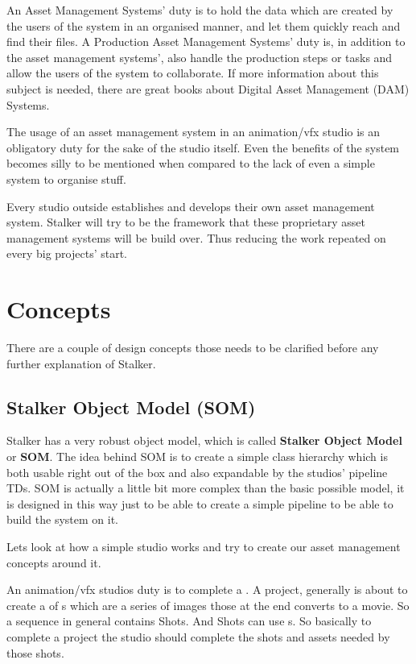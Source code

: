 \documentclass[a4paper,10pt,english]{sphinxmanual}
\begin{document}
An Asset Management Systems' duty is to hold the data which are created by the
users of the system in an organised manner, and let them quickly reach and find
their files. A Production Asset Management Systems' duty is, in addition to the
asset management systems', also handle the production steps or tasks and
allow the users of the system to collaborate. If more information about this
subject is needed, there are great books about Digital Asset Management (DAM)
Systems.

The usage of an asset management system in an animation/vfx studio is an
obligatory duty for the sake of the studio itself. Even the benefits of the
system becomes silly to be mentioned when compared to the lack of even a simple
system to organise stuff.

Every studio outside establishes and develops their own asset management
system. Stalker will try to be the framework that these proprietary asset
management systems will be build over. Thus reducing the work repeated on every
big projects' start.


\section{Concepts}
\label{design:concepts}
There are a couple of design concepts those needs to be clarified before any
further explanation of Stalker.


\subsection{Stalker Object Model (SOM)}
\label{design:stalker-object-model-som}
Stalker has a very robust object model, which is called
\textbf{Stalker Object Model} or \textbf{SOM}. The idea behind SOM is to create a simple
class hierarchy which is both usable right out of the box and also expandable
by the studios' pipeline TDs. SOM is actually a little bit more complex than
the basic possible model, it is designed in this way just to be able to create
a simple pipeline to be able to build the system on it.

Lets look at how a simple studio works and try to create our asset management
concepts around it.

An animation/vfx studios duty is to complete a
. A project, generally is about to
create a  of
s which are a series of images those at the
end converts to a movie. So a sequence in general contains Shots. And Shots can
use s. So basically to complete a
project the studio should complete the shots and assets needed by those shots.
\end{document}
